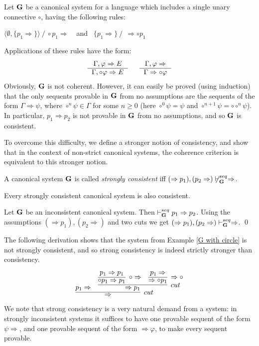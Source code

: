 \documentclass{LMCS}
\theoremstyle{remark}
\newcommand{\G}{{\bf G}}
\newcommand{\Ra}{\Rightarrow}
\newcommand{\g}{\Gamma}
\newcommand{\vd}{\vdash}
\newcommand{\ms}{\medskip}
\newcommand{\tup}[1]{\langle #1 \rangle}
\newcommand{\fe}{\varphi}
\newcommand{\dera}[2]{
    \begin{tabular}{c}
    $ #1 $ \\ \hline
    $ #2 $ \\
\end{tabular}}
\begin{document}
\begin{exa}
\label{G with circle}
Let ${\G}$ be a canonical system for a language which includes
 a single unary connective $\circ$, having
the following rules:
\begin{center}
$\tup{\emptyset,\{p_1 \Ra \}} \ / \ \circ p_1 \Ra \ $
\ and \
$\{p_1 \Ra \} \ / \  \ \Ra \circ p_1 $
\end{center}
Applications of these rules have the form:
\[
\dera{\g, \fe \Ra E}
{\g,\circ \fe \Ra E}
\ \ \ \ \
\dera{\g, \fe \Ra }
{\g \Ra \circ \fe}
\]
Obviously, ${\G}$ is not coherent.
However, 
it can easily be proved (using induction) that the only sequents
provable in $\G$ from no assumptions
are the sequents of the form $\g\Ra\psi$, where $\circ^n\psi\in\g$ for some $n\geq 0$
(here $\circ^0\psi=\psi$ and $\circ^{n+1}\psi=\circ\circ^{n}\psi$).
In particular, $p_1\Ra p_2$ is not provable in $\G$ from no assumptions, and so $\G$ is consistent.
\end{exa}


\ms
To overcome this difficulty, we define a stronger notion of consistency,
and show that in the context of non-strict canonical systems,
the coherence criterion is equivalent to this stronger notion.

\begin{defi}
\label{strong consistency}
A canonical system ${\G}$ is called {\em strongly consistent} 
iff ${(\Ra p_1),(p_2\Ra)\not\vd_{\G}^{seq}\Ra}$.
\end{defi}

\begin{prop}
\label{strong consistency -> consistency}
Every strongly consistent canonical system is also consistent.
\end{prop}
\proof
Let ${\G}$ be an inconsistent canonical system.
Then $\vd_{\G}^{seq} p_1 \Ra p_2$. 
Using the assumptions $(\Ra p_1),(p_2\Ra)$ and two cuts we get
$(\Ra p_1),(p_2\Ra)\vd_{\G}^{seq} \Ra$.
\qed

\medskip\noindent
The following derivation shows that the system from Example \ref{G with circle}
is not strongly consistent, and so strong consistency is indeed 
strictly stronger than consistency.

$$\infer[cut]{\Ra} {
	 { p_1\Ra} 
 	& \infer[cut]	{ \Ra p_1}   {
  		 \infer[\circ\Ra] {\circ p_1 \Ra p_1} {p_1 \Ra p_1}  & 
  		 \infer[\Ra\circ] { \Ra \circ p_1} {p_1 \Ra } } }$$

\noindent We note that strong consistency is a very natural demand
from a system: in strongly inconsistent systems it suffices to have
one provable sequent of the form $\psi\Ra$, and one provable sequent
of the form $\Ra\fe$, to make every sequent provable.
\end{document}
